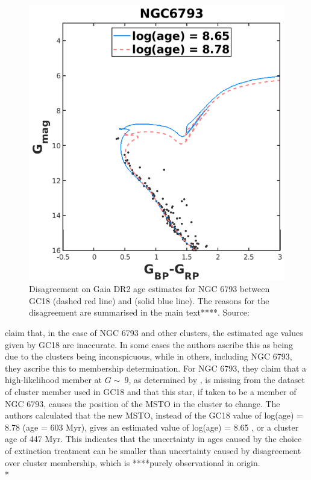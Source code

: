 \documentclass[12pt, a4paper]{report}
\begin{document}
\begin{figure}[h!]
\begin{center}
\includegraphics[width=1.0\textwidth]{bossini_ngc6793_different_age_estimate.png}
\caption{Disagreement on Gaia DR2 age estimates for NGC 6793 between GC18 (dashed red line) and \cite{2019A&A...623A.108B} (solid blue line). The reasons for the disagreement are summarised in the main text****. Source:\cite{2019A&A...623A.108B}}
\label{bossini_age_cmd}
\end{center}
\end{figure}

\cite{2019A&A...623A.108B} claim that, in the case of NGC 6793 and other clusters, the estimated age values given by GC18 are inaccurate. In some cases the authors ascribe this as being due to the clusters being inconspicuous, while in others, including NGC 6793, they ascribe this to membership determination. For NGC 6793, they claim that a high-likelihood member at $G \sim\ 9$, as determined by \cite{2018A&A...618A..93C}, is missing from the dataset of cluster member used in GC18 and that this star, if taken to be a member of NGC 6793, causes the position of the MSTO in the cluster to change. The authors calculated that the new MSTO, instead of the GC18 value of log(age) = 8.78 (age = 603 Myr), gives an estimated value of log(age) = 8.65 , or a cluster age of 447 Myr. This indicates that the uncertainty in ages caused by the choice of extinction treatment can be smaller than uncertainty caused by disagreement over cluster membership, which is ****purely observational in origin. \\*
\end{document}

